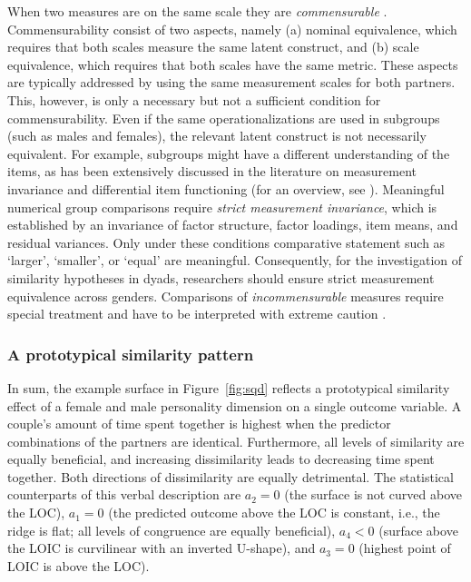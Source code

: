 \documentclass[jou,a4paper,draftfirst]{apa6}
\begin{document}
When two measures are on the same scale they are \emph{commensurable} \parencite{edwards_relationship_2007}. Commensurability consist of two aspects, namely (a) nominal equivalence, which requires that both scales measure the same latent construct, and (b) scale equivalence, which requires that both scales have the same metric. These aspects are typically addressed by using the same measurement scales for both partners. This, however, is only a necessary but not a sufficient condition for commensurability. Even if the same operationalizations are used in subgroups (such as males and females), the relevant latent construct is not necessarily equivalent. For example, subgroups might have a different understanding of the items, as has been extensively discussed in the literature on measurement invariance and differential item functioning (for an overview, see ). Meaningful numerical group comparisons require \emph{strict measurement invariance}, which is established by an invariance of factor structure, factor loadings, item means, and residual variances. Only under these conditions comparative statement such as `larger', `smaller', or `equal' are meaningful. Consequently, for the investigation of similarity hypotheses in dyads, researchers should ensure strict measurement equivalence across genders. Comparisons of \textit{incommensurable} measures require special treatment and have to be interpreted with extreme caution \parencite{schonbrodt_testing_2015}.

\subsubsection{A prototypical similarity pattern}
In sum, the example surface in Figure~\ref{fig:sqd} reflects a prototypical similarity effect of a female and male personality dimension on a single outcome variable. A couple’s amount of time spent together is highest when the predictor combinations of the partners are identical. Furthermore, all levels of similarity are equally beneficial, and increasing dissimilarity leads to decreasing time spent together. Both directions of dissimilarity are equally detrimental. The statistical counterparts of this verbal description are $a_2 = 0$ (the surface is not curved above the LOC), $a_1 = 0$ (the predicted outcome above the LOC is constant, i.e., the ridge is flat; all levels of congruence are equally beneficial), $a_4 < 0$ (surface above the LOIC is curvilinear with an inverted U-shape), and $a_3 = 0$ (highest point of LOIC is above the LOC). 
\end{document}
